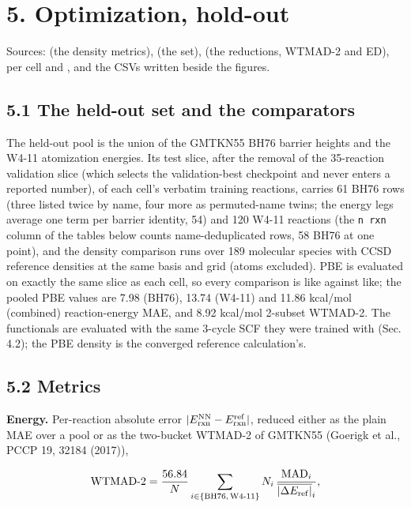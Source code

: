 \documentclass[10pt,a4paper]{article}
\begin{document}
\section*{5. Optimization, hold-out}

Sources:  (the density metrics),  (the set),  (the reductions, WTMAD-2 and ED), per cell  and , and the CSVs written beside the figures.

\subsection*{5.1 The held-out set and the comparators}

The held-out pool is the union of the GMTKN55 BH76 barrier heights and the W4-11 atomization energies. Its test slice, after the removal of the 35-reaction validation slice (which selects the validation-best checkpoint and never enters a reported number), of each cell's verbatim training reactions, carries 61 BH76 rows (three listed twice by name, four more as permuted-name twins; the energy legs average one term per barrier identity, 54) and 120 W4-11 reactions (the \texttt{n rxn} column of the tables below counts name-deduplicated rows, 58 BH76 at one point), and the density comparison runs over 189 molecular species with CCSD reference densities at the same basis and grid (atoms excluded). PBE is evaluated on exactly the same slice as each cell, so every comparison is like against like; the pooled PBE values are 7.98 (BH76), 13.74 (W4-11) and 11.86 kcal/mol (combined) reaction-energy MAE, and 8.92 kcal/mol 2-subset WTMAD-2. The functionals are evaluated with the same 3-cycle SCF they were trained with (Sec. 4.2); the PBE density is the converged reference calculation's.

\subsection*{5.2 Metrics}

\textbf{Energy.} Per-reaction absolute error $|E^{\rm NN}_{\rm rxn} - E^{\rm ref}_{\rm rxn}|$, reduced either as the plain MAE over a pool or as the two-bucket WTMAD-2 of GMTKN55 (Goerigk et al., PCCP 19, 32184 (2017)),

\[
\mathrm{WTMAD\text{-}2} = \frac{56.84}{N}\sum_{i\in\{\rm BH76,\,W4\text{-}11\}} N_i\,\frac{\mathrm{MAD}_i}{\overline{|\Delta E_{\rm ref}|}_i},
\]
\end{document}
